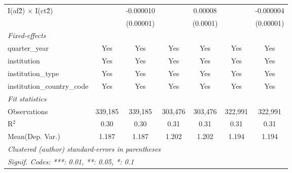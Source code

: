 \begin{tabular}{lcccccc}
   I(af\^2) $\times$ I(ct\^2)         &               & -0.000010      &               & 0.00008         &               & -0.000004\\   
                                      &               & (0.00001)      &               & (0.0001)        &               & (0.00001)\\   
   \midrule
   \emph{Fixed-effects}\\
   quarter\_year                      & Yes           & Yes            & Yes           & Yes             & Yes           & Yes\\  
   institution                        & Yes           & Yes            & Yes           & Yes             & Yes           & Yes\\  
   institution\_type                  & Yes           & Yes            & Yes           & Yes             & Yes           & Yes\\  
   institution\_country\_code         & Yes           & Yes            & Yes           & Yes             & Yes           & Yes\\  
   \midrule
   \emph{Fit statistics}\\
   Observations                       & 339,185       & 339,185        & 303,476       & 303,476         & 322,991       & 322,991\\  
   R$^2$                              & 0.30          & 0.30           & 0.31          & 0.31            & 0.31          & 0.31\\  
Mean(Dep. Var.) & 1.187 & 1.187 & 1.202 & 1.202 & 1.194 & 1.194 \\
   \midrule \midrule
   \multicolumn{7}{l}{\emph{Clustered (author) standard-errors in parentheses}}\\
   \multicolumn{7}{l}{\emph{Signif. Codes: ***: 0.01, **: 0.05, *: 0.1}}\\
\end{tabular}
\par\endgroup

